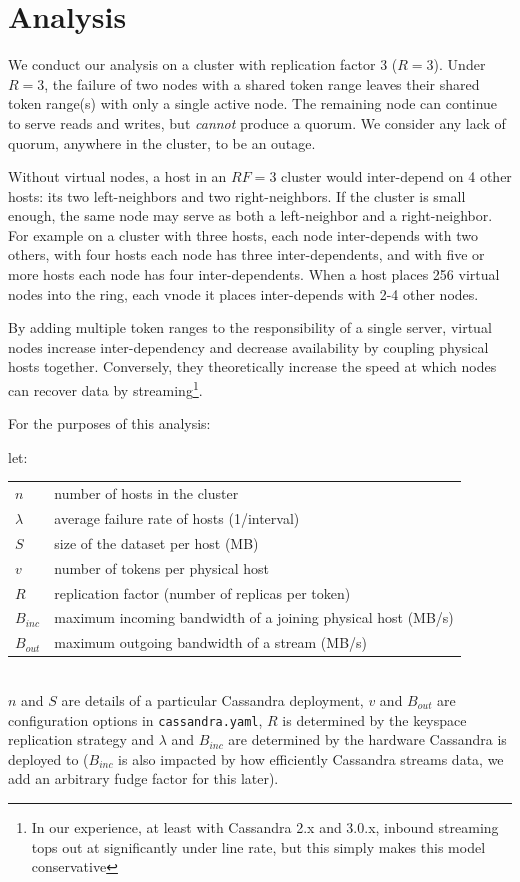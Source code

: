\documentclass{article}
\makeatletter
\newenvironment{conditions}[1][let:]
  {#1 \begin{tabular}[t]{>{$}l<{$} @{${}={}$} l}}
  {\end{tabular}\\[\belowdisplayskip]}
\makeatother
\begin{document}
\section{Analysis}
\label{sec:analysis}
We conduct our analysis on a cluster with replication factor 3 ($R=3$). Under
$R=3$, the failure of two nodes with a shared token range leaves their shared
token range(s) with only a single active node. The remaining node can continue
to serve reads and writes, but \emph{cannot} produce a quorum. We consider any
lack of quorum, anywhere in the cluster, to be an outage.

Without virtual nodes, a host in an $RF=3$ cluster would inter-depend on 4
other hosts: its two left-neighbors and two right-neighbors. If the cluster
is small enough, the same node may serve as both a left-neighbor and a
right-neighbor. For example on a cluster with three hosts, each node
inter-depends with two others, with four hosts each node has three
inter-dependents, and with five or more hosts each node has four
inter-dependents. When a host places 256 virtual nodes into the ring, each
vnode it places inter-depends with 2-4 other nodes.

By adding multiple token ranges to the responsibility of a single server,
virtual nodes increase inter-dependency and decrease availability by
coupling physical hosts together. Conversely, they theoretically increase the
speed at which nodes can recover data by streaming\footnote{In our experience,
at least with Cassandra 2.x and 3.0.x, inbound streaming tops out at significantly
under line rate, but this simply makes this model conservative}.

For the purposes of this analysis:

\begin{conditions}
 n       &  number of hosts in the cluster \\
 \lambda &  average failure rate of hosts (1/interval) \\
 S       &  size of the dataset per host (MB) \\
 v       &  number of tokens per physical host \\
 R       &  replication factor (number of replicas per token) \\
 B_{inc} &  maximum incoming bandwidth of a joining physical host (MB/s) \\
 B_{out} &  maximum outgoing bandwidth of a stream (MB/s) \\
\end{conditions}
$n$ and $S$ are details of a particular Cassandra deployment, $v$ and $B_{out}$
are configuration options in \texttt{cassandra.yaml}, $R$ is determined by the
keyspace replication strategy and $\lambda$ and $B_{inc}$ are determined by the
hardware Cassandra is deployed to ($B_{inc}$ is also impacted by how efficiently
Cassandra streams data, we add an arbitrary fudge factor for this later).
\end{document}
